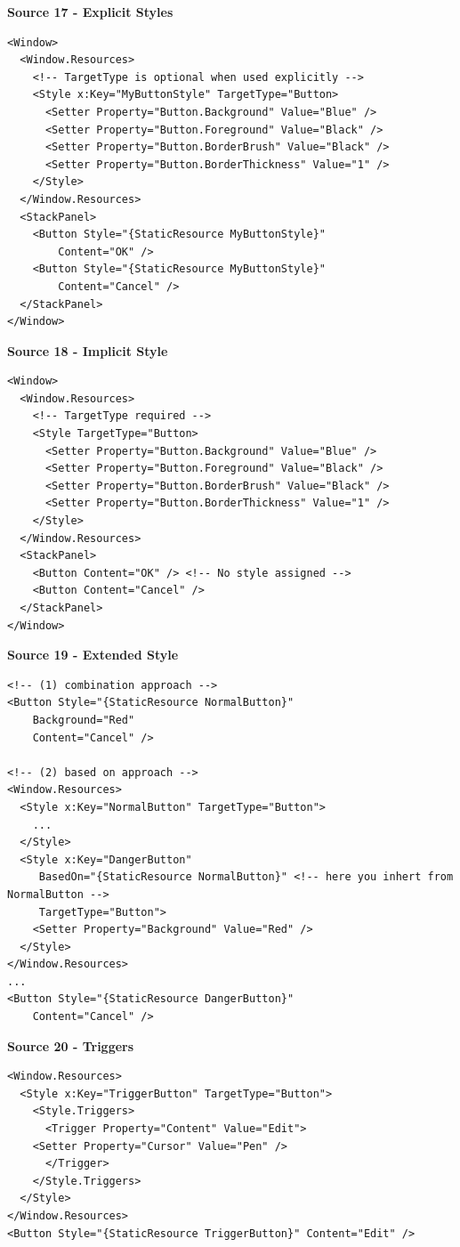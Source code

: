 \documentclass[10pt,twoside,landscape]{article}
\begin{document}
\begin{multicols}{2}
\textbf{Source 17 - Explicit Styles}
\lstset{language=XML,label= ,caption= ,captionpos=b,numbers=none}
\begin{lstlisting}
<Window>
  <Window.Resources>
    <!-- TargetType is optional when used explicitly -->
    <Style x:Key="MyButtonStyle" TargetType="Button>
      <Setter Property="Button.Background" Value="Blue" />
      <Setter Property="Button.Foreground" Value="Black" />
      <Setter Property="Button.BorderBrush" Value="Black" />
      <Setter Property="Button.BorderThickness" Value="1" />
    </Style>
  </Window.Resources>
  <StackPanel>
    <Button Style="{StaticResource MyButtonStyle}"
	    Content="OK" />
    <Button Style="{StaticResource MyButtonStyle}"
	    Content="Cancel" />
  </StackPanel>
</Window>
\end{lstlisting}

\textbf{Source 18 - Implicit Style}
\lstset{language=XML,label= ,caption= ,captionpos=b,numbers=none}
\begin{lstlisting}
<Window>
  <Window.Resources>
    <!-- TargetType required -->
    <Style TargetType="Button>
      <Setter Property="Button.Background" Value="Blue" />
      <Setter Property="Button.Foreground" Value="Black" />
      <Setter Property="Button.BorderBrush" Value="Black" />
      <Setter Property="Button.BorderThickness" Value="1" />
    </Style>
  </Window.Resources>
  <StackPanel>
    <Button Content="OK" /> <!-- No style assigned -->
    <Button Content="Cancel" />
  </StackPanel>
</Window>
\end{lstlisting}


\textbf{Source 19 - Extended Style}
\lstset{language=XML,label= ,caption= ,captionpos=b,numbers=none}
\begin{lstlisting}
<!-- (1) combination approach -->
<Button Style="{StaticResource NormalButton}"
	Background="Red"
	Content="Cancel" />

<!-- (2) based on approach -->
<Window.Resources>
  <Style x:Key="NormalButton" TargetType="Button">
    ...
  </Style>
  <Style x:Key="DangerButton"
	 BasedOn="{StaticResource NormalButton}" <!-- here you inhert from NormalButton -->
	 TargetType="Button">
    <Setter Property="Background" Value="Red" />
  </Style>
</Window.Resources>
...
<Button Style="{StaticResource DangerButton}"
	Content="Cancel" />
\end{lstlisting}

\textbf{Source 20 - Triggers}
\lstset{language=XML,label= ,caption= ,captionpos=b,numbers=none}
\begin{lstlisting}
<Window.Resources>
  <Style x:Key="TriggerButton" TargetType="Button">
    <Style.Triggers>
      <Trigger Property="Content" Value="Edit">
	<Setter Property="Cursor" Value="Pen" />
      </Trigger>
    </Style.Triggers>
  </Style>
</Window.Resources>
<Button Style="{StaticResource TriggerButton}" Content="Edit" />
\end{lstlisting}


\end{multicols}
\end{document}
